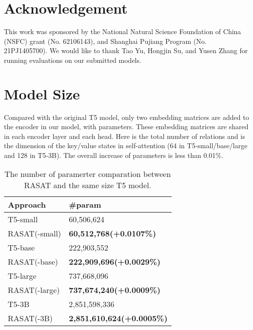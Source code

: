 \documentclass[11pt]{article}
\begin{document}
\section*{Acknowledgement}
This work was sponsored by the National Natural Science Foundation of China (NSFC) grant (No.
62106143), and Shanghai Pujiang Program (No. 21PJ1405700). We would like to thank Tao Yu, Hongjin Su, and Yusen Zhang for running evaluations on our submitted models. \clearpage








\newpage

\appendix
\clearpage


\section{Model Size}
\label{sec:appendix_paramerter}
Compared with the original T5 model, only two embedding matrices are added to the encoder in our model, with  parameters. These embedding matrices are shared in each encoder layer and each head.  Here  is the total number of relations and  is the dimension of the key/value states in self-attention (64 in T5-small/base/large and 128 in T5-3B). The overall increase of parameters is less than 0.01\%.


\begin{table}[h]
\centering
\begin{tabular}{ll}
\toprule
Approach      & \#param                       \\ 
\midrule
T5-small      & 60,506,624                      \\
RASAT(-small) & \textbf{60,512,768(+0.0107\%)}  \\ 
\midrule
T5-base       & 222,903,552                     \\
RASAT(-base)  & \textbf{222,909,696(+0.0029\%)} \\ 
\midrule
T5-large      & 737,668,096                     \\
RASAT(-large) & \textbf{737,674,240(+0.0009\%)} \\ 
\midrule
T5-3B         & 2,851,598,336                    \\
RASAT(-3B)    & \textbf{2,851,610,624(+0.0005\%)} \\ 
\bottomrule
\end{tabular}
\caption{The number of paramerter comparation between RASAT and the same size T5 model.}
\label{tab:param}
\end{table}
\end{document}

